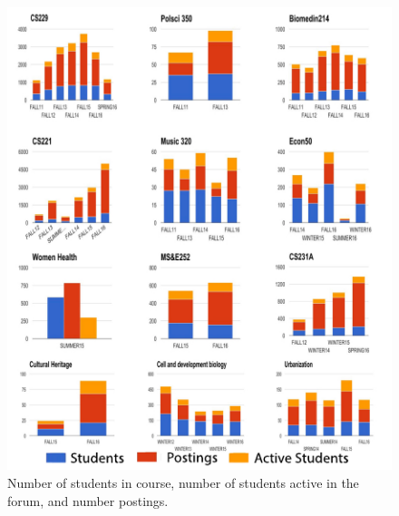  \begin{figure}[htp]
       \centering
       \includegraphics{Figs/classesInDatasetLegendAltered.pdf}
       \caption{\textnormal{Number of students in course, number of
           students active in the forum, and number postings.}}
       \label{fig:simpleCrsStats}
\end{figure}
 
